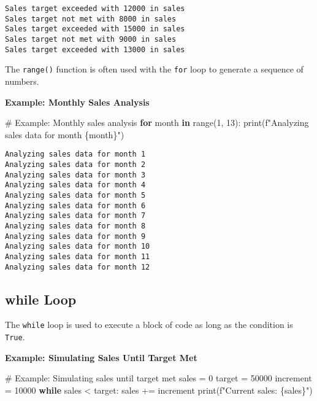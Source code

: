 \documentclass[
  letterpaper,
  DIV=11,
  numbers=noendperiod]{scrreprt}
\newenvironment{Shaded}{\begin{snugshade}}{\end{snugshade}}
\newcommand{\BuiltInTok}[1]{\textcolor[rgb]{0.00,0.23,0.31}{#1}}
\newcommand{\CommentTok}[1]{\textcolor[rgb]{0.37,0.37,0.37}{#1}}
\newcommand{\ControlFlowTok}[1]{\textcolor[rgb]{0.00,0.23,0.31}{\textbf{#1}}}
\newcommand{\DecValTok}[1]{\textcolor[rgb]{0.68,0.00,0.00}{#1}}
\newcommand{\KeywordTok}[1]{\textcolor[rgb]{0.00,0.23,0.31}{\textbf{#1}}}
\newcommand{\NormalTok}[1]{\textcolor[rgb]{0.00,0.23,0.31}{#1}}
\newcommand{\OperatorTok}[1]{\textcolor[rgb]{0.37,0.37,0.37}{#1}}
\newcommand{\SpecialCharTok}[1]{\textcolor[rgb]{0.37,0.37,0.37}{#1}}
\newcommand{\SpecialStringTok}[1]{\textcolor[rgb]{0.13,0.47,0.30}{#1}}
\begin{document}
\begin{verbatim}
Sales target exceeded with 12000 in sales
Sales target not met with 8000 in sales
Sales target exceeded with 15000 in sales
Sales target not met with 9000 in sales
Sales target exceeded with 13000 in sales
\end{verbatim}

The \texttt{range()} function is often used with the \texttt{for} loop
to generate a sequence of numbers.

\textbf{Example: Monthly Sales Analysis}

\begin{Shaded}
\begin{Highlighting}[]
\CommentTok{\# Example: Monthly sales analysis}
\ControlFlowTok{for}\NormalTok{ month }\KeywordTok{in} \BuiltInTok{range}\NormalTok{(}\DecValTok{1}\NormalTok{, }\DecValTok{13}\NormalTok{):}
    \BuiltInTok{print}\NormalTok{(}\SpecialStringTok{f"Analyzing sales data for month }\SpecialCharTok{\{}\NormalTok{month}\SpecialCharTok{\}}\SpecialStringTok{"}\NormalTok{)}
\end{Highlighting}
\end{Shaded}

\begin{verbatim}
Analyzing sales data for month 1
Analyzing sales data for month 2
Analyzing sales data for month 3
Analyzing sales data for month 4
Analyzing sales data for month 5
Analyzing sales data for month 6
Analyzing sales data for month 7
Analyzing sales data for month 8
Analyzing sales data for month 9
Analyzing sales data for month 10
Analyzing sales data for month 11
Analyzing sales data for month 12
\end{verbatim}

\subsection{while Loop}\label{while-loop-2}

The \texttt{while} loop is used to execute a block of code as long as
the condition is \texttt{True}.

\textbf{Example: Simulating Sales Until Target Met}

\begin{Shaded}
\begin{Highlighting}[]
\CommentTok{\# Example: Simulating sales until target met}
\NormalTok{sales }\OperatorTok{=} \DecValTok{0}
\NormalTok{target }\OperatorTok{=} \DecValTok{50000}
\NormalTok{increment }\OperatorTok{=} \DecValTok{10000}
\ControlFlowTok{while}\NormalTok{ sales }\OperatorTok{\textless{}}\NormalTok{ target:}
\NormalTok{    sales }\OperatorTok{+=}\NormalTok{ increment}
    \BuiltInTok{print}\NormalTok{(}\SpecialStringTok{f"Current sales: }\SpecialCharTok{\{}\NormalTok{sales}\SpecialCharTok{\}}\SpecialStringTok{"}\NormalTok{)}
\end{Highlighting}
\end{Shaded}
\end{document}
